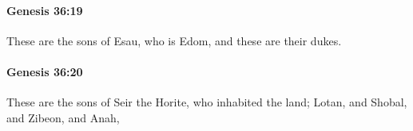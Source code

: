 		\paragraph{Genesis 36:19} %
			\label{GENESIS-36-19}

			These are the sons of Esau, who is Edom, and these are their dukes.


		\paragraph{Genesis 36:20} %
			\label{GENESIS-36-20}

			These are the sons of Seir the Horite, who inhabited the land; Lotan, and Shobal, and Zibeon, and Anah,


